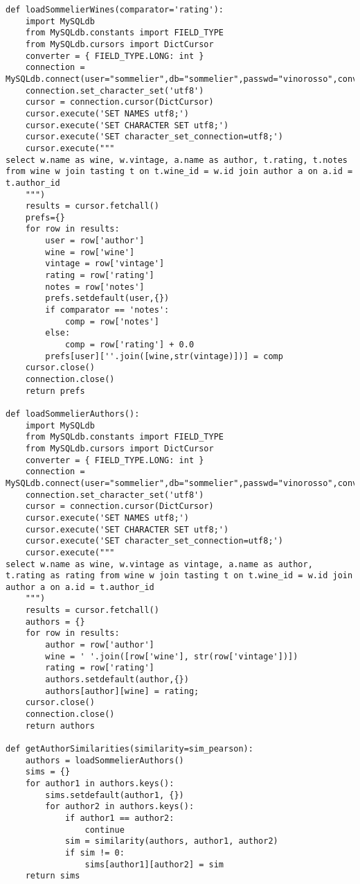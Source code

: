 \begin{verbatim}
def loadSommelierWines(comparator='rating'):
    import MySQLdb
    from MySQLdb.constants import FIELD_TYPE
    from MySQLdb.cursors import DictCursor
    converter = { FIELD_TYPE.LONG: int }
    connection = MySQLdb.connect(user="sommelier",db="sommelier",passwd="vinorosso",conv=converter)
    connection.set_character_set('utf8')
    cursor = connection.cursor(DictCursor)
    cursor.execute('SET NAMES utf8;')
    cursor.execute('SET CHARACTER SET utf8;')
    cursor.execute('SET character_set_connection=utf8;')
    cursor.execute("""
select w.name as wine, w.vintage, a.name as author, t.rating, t.notes 
from wine w join tasting t on t.wine_id = w.id join author a on a.id = t.author_id
    """)
    results = cursor.fetchall()
    prefs={}
    for row in results:
        user = row['author']
        wine = row['wine']
        vintage = row['vintage']
        rating = row['rating']
        notes = row['notes']
        prefs.setdefault(user,{})
        if comparator == 'notes':
            comp = row['notes']
        else:
            comp = row['rating'] + 0.0
        prefs[user][''.join([wine,str(vintage)])] = comp
    cursor.close()
    connection.close()
    return prefs

def loadSommelierAuthors():
    import MySQLdb
    from MySQLdb.constants import FIELD_TYPE
    from MySQLdb.cursors import DictCursor
    converter = { FIELD_TYPE.LONG: int }
    connection = MySQLdb.connect(user="sommelier",db="sommelier",passwd="vinorosso",conv=converter)
    connection.set_character_set('utf8')
    cursor = connection.cursor(DictCursor)
    cursor.execute('SET NAMES utf8;')
    cursor.execute('SET CHARACTER SET utf8;')
    cursor.execute('SET character_set_connection=utf8;')
    cursor.execute("""
select w.name as wine, w.vintage as vintage, a.name as author, t.rating as rating from wine w join tasting t on t.wine_id = w.id join author a on a.id = t.author_id
    """)
    results = cursor.fetchall()
    authors = {}
    for row in results:
        author = row['author']
        wine = ' '.join([row['wine'], str(row['vintage'])])
        rating = row['rating']
        authors.setdefault(author,{})
        authors[author][wine] = rating;
    cursor.close()
    connection.close()
    return authors

def getAuthorSimilarities(similarity=sim_pearson):
    authors = loadSommelierAuthors()
    sims = {}
    for author1 in authors.keys():
        sims.setdefault(author1, {})
        for author2 in authors.keys():
            if author1 == author2:
                continue
            sim = similarity(authors, author1, author2)
            if sim != 0:
                sims[author1][author2] = sim
    return sims
\end{verbatim}

